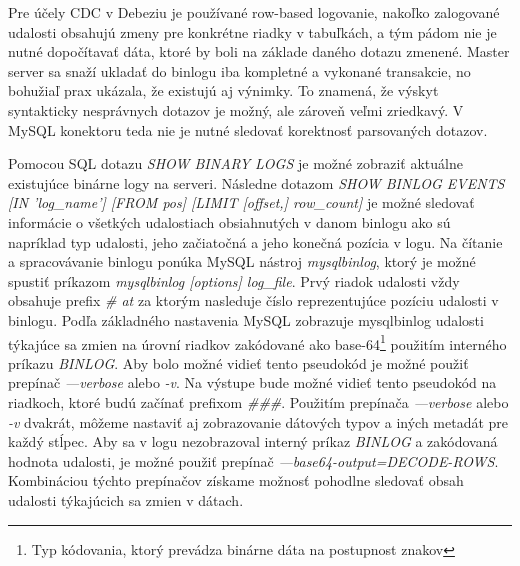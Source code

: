 Pre účely CDC v Debeziu je používané row-based logovanie, nakoľko zalogované udalosti obsahujú zmeny pre konkrétne riadky v tabuľkách, a tým pádom nie je nutné dopočítavať dáta, ktoré by boli na základe daného dotazu zmenené. Master server sa snaží ukladať do binlogu iba kompletné a vykonané transakcie, no bohužiaľ prax ukázala, že existujú aj výnimky. To znamená, že výskyt syntakticky nesprávnych dotazov je možný, ale zároveň veľmi zriedkavý. V MySQL konektoru teda nie je nutné sledovať korektnosť parsovaných dotazov.

Pomocou SQL dotazu \textit{SHOW BINARY LOGS} je možné zobraziť aktuálne existujúce binárne logy na serveri. Následne dotazom \textit{SHOW BINLOG EVENTS [IN 'log\_name']  [FROM pos] [LIMIT [offset,] row\_count]} je možné sledovať informácie o všetkých udalostiach obsiahnutých v danom binlogu ako sú napríklad typ udalosti, jeho začiatočná a jeho konečná pozícia v logu. Na čítanie a spracovávanie binlogu ponúka MySQL nástroj \textit{mysqlbinlog}, ktorý je možné spustiť príkazom \textit{mysqlbinlog [options] log\_file}. Prvý riadok udalosti vždy obsahuje prefix \textit{\# at} za ktorým nasleduje číslo reprezentujúce pozíciu udalosti v binlogu. Podľa základného nastavenia MySQL zobrazuje mysqlbinlog udalosti týkajúce sa zmien na úrovní riadkov zakódované ako base-64\footnote{Typ kódovania, ktorý prevádza binárne dáta na postupnost znakov} použitím interného príkazu \textit{BINLOG}. Aby bolo možné vidieť tento pseudokód je možné použiť prepínač \textit{---verbose} alebo \textit{-v}. Na výstupe bude možné vidieť tento pseudokód na riadkoch, ktoré budú začínať prefixom  \textit{\#\#\#}. Použitím prepínača \textit{---verbose} alebo \textit{-v} dvakrát, môžeme nastaviť aj zobrazovanie dátových typov a iných metadát pre každý stĺpec. Aby sa v logu nezobrazoval interný príkaz \textit{BINLOG} a zakódovaná hodnota udalosti, je možné použiť prepínač \textit{---base64-output=DECODE-ROWS}. Kombináciou týchto prepínačov získame možnosť pohodlne sledovať obsah udalosti týkajúcich sa zmien v dátach. \cite{mysql:reference_manual}

